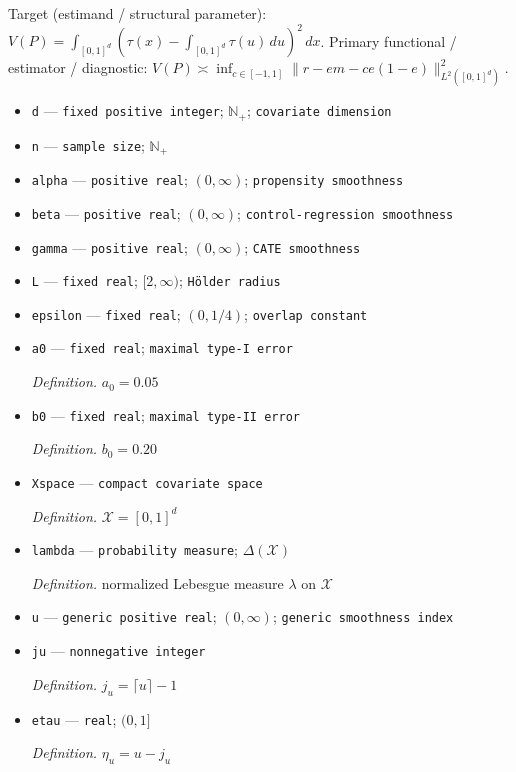 \documentclass{article}
\begin{document}
Target (estimand / structural parameter): \(V(P)=\int_{[0,1]^d}(\tau(x)-\int_{[0,1]^d}\tau(u)\,du)^2\,dx\).
Primary functional / estimator / diagnostic: \(V(P)\asymp\inf_{c\in[-1,1]}\|r-em-c e(1-e)\|_{L^2([0,1]^d)}^2\).
\begin{itemize}
  \item \texttt{d} --- \texttt{fixed positive integer}; \(\mathbb N_{+}\); \texttt{covariate dimension}
  \item \texttt{n} --- \texttt{sample size}; \(\mathbb N_{+}\)
  \item \texttt{alpha} --- \texttt{positive real}; \((0,\infty)\); \texttt{propensity smoothness}
  \item \texttt{beta} --- \texttt{positive real}; \((0,\infty)\); \texttt{control-\allowbreak{}regression smoothness}
  \item \texttt{gamma} --- \texttt{positive real}; \((0,\infty)\); \texttt{CATE smoothness}
  \item \texttt{L} --- \texttt{fixed real}; \([2,\infty)\); \texttt{Hölder radius}
  \item \texttt{epsilon} --- \texttt{fixed real}; \((0,1/4)\); \texttt{overlap constant}
  \item \texttt{a0} --- \texttt{fixed real}; \texttt{maximal type-\allowbreak{}I error}
  \par\smallskip\noindent\emph{Definition.} \(a_0=0.05\)
  \item \texttt{b0} --- \texttt{fixed real}; \texttt{maximal type-\allowbreak{}II error}
  \par\smallskip\noindent\emph{Definition.} \(b_0=0.20\)
  \item \texttt{Xspace} --- \texttt{compact covariate space}
  \par\smallskip\noindent\emph{Definition.} \(\mathcal X=[0,1]^d\)
  \item \texttt{lambda} --- \texttt{probability measure}; \(\Delta(\mathcal X)\)
  \par\smallskip\noindent\emph{Definition.} normalized Lebesgue measure \(\lambda\) on \(\mathcal X\)
  \item \texttt{u} --- \texttt{generic positive real}; \((0,\infty)\); \texttt{generic smoothness index}
  \item \texttt{ju} --- \texttt{nonnegative integer}
  \par\smallskip\noindent\emph{Definition.} \(j_u=\lceil u\rceil-1\)
  \item \texttt{etau} --- \texttt{real}; \((0,1]\)
  \par\smallskip\noindent\emph{Definition.} \(\eta_u=u-j_u\)

\end{itemize}
\end{document}
